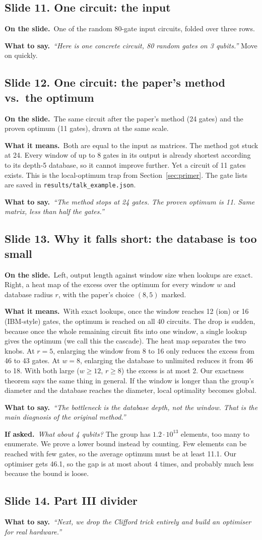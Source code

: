 \documentclass[11pt,a4paper]{article}
\newcommand{\say}[1]{\emph{``#1''}}
\newcommand{\slide}[2]{\subsection*{Slide #1. #2}}
\newcommand{\shows}{\par\textbf{\color{ibar}On the slide.}\ }
\newcommand{\means}{\par\textbf{\color{ibar}What it means.}\ }
\newcommand{\tosay}{\par\textbf{\color{ibar}What to say.}\ }
\newcommand{\ifasked}{\par\textbf{\color{ibar}If asked.}\ }
\begin{document}
\slide{11}{One circuit: the input}
\shows One of the random 80-gate input circuits, folded over three rows.
\tosay \say{Here is one concrete circuit, 80 random gates on 3 qubits.} Move on quickly.

\slide{12}{One circuit: the paper's method vs.\ the optimum}
\shows The same circuit after the paper's method (24 gates) and the proven optimum (11 gates), drawn at the same scale.
\means Both are equal to the input as matrices. The method got stuck at 24. Every window of up to 8 gates in its output is
already shortest according to its depth-5 database, so it cannot improve further. Yet a circuit of 11 gates exists. This is
the local-optimum trap from Section~\ref{sec:primer}. The gate lists are saved in \texttt{results/talk\_example.json}.
\tosay \say{The method stops at 24 gates. The proven optimum is 11. Same matrix, less than half the gates.}

\slide{13}{Why it falls short: the database is too small}
\shows Left, output length against window size when lookups are exact. Right, a heat map of the excess over the optimum
for every window $w$ and database radius $r$, with the paper's choice $(8,5)$ marked.
\means With exact lookups, once the window reaches 12 (ion) or 16 (IBM-style) gates, the optimum is reached on all 40
circuits. The drop is sudden, because once the whole remaining circuit fits into one window, a single lookup gives the
optimum (we call this the cascade). The heat map separates the two knobs. At $r=5$, enlarging the window from 8 to 16 only
reduces the excess from 46 to 43 gates. At $w=8$, enlarging the database to unlimited reduces it from 46 to 18. With both
large ($w\ge12$, $r\ge8$) the excess is at most 2. Our exactness theorem says the same thing in general. If the window is
longer than the group's diameter and the database reaches the diameter, local optimality becomes global.
\tosay \say{The bottleneck is the database depth, not the window. That is the main diagnosis of the original method.}
\ifasked \emph{What about 4 qubits?} The group has $1.2\cdot10^{13}$ elements, too many to enumerate. We prove a lower bound
instead by counting. Few elements can be reached with few gates, so the average optimum must be at least 11.1. Our
optimiser gets 46.1, so the gap is at most about 4 times, and probably much less because the bound is loose.

\slide{14}{Part III divider}
\tosay \say{Next, we drop the Clifford trick entirely and build an optimiser for real hardware.}
\end{document}
